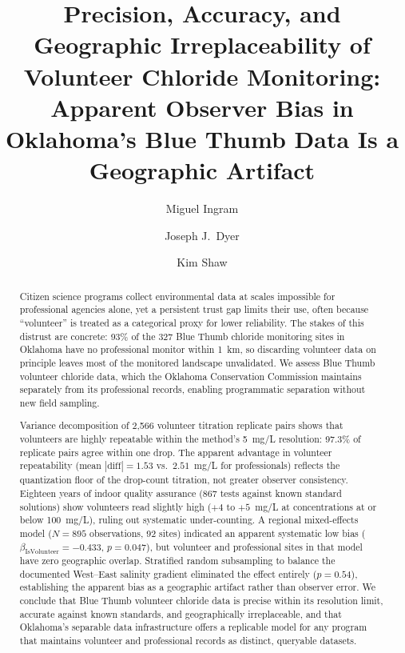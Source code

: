 \documentclass[lineno]{wlpeerj}
\begin{document}
\title{Precision, Accuracy, and Geographic Irreplaceability of Volunteer Chloride Monitoring: Apparent Observer Bias in Oklahoma's Blue Thumb Data Is a Geographic Artifact}

\author[1]{Miguel Ingram}
\author[2]{Joseph J.\ Dyer}
\author[2]{Kim Shaw}


\begin{abstract}
Citizen science programs collect environmental data at scales impossible for professional agencies alone, yet a persistent trust gap limits their use, often because ``volunteer'' is treated as a categorical proxy for lower reliability. The stakes of this distrust are concrete: 93\% of the 327 Blue Thumb chloride monitoring sites in Oklahoma have no professional monitor within 1~km, so discarding volunteer data on principle leaves most of the monitored landscape unvalidated. We assess Blue Thumb volunteer chloride data, which the Oklahoma Conservation Commission maintains separately from its professional records, enabling programmatic separation without new field sampling.

Variance decomposition of 2,566 volunteer titration replicate pairs shows that volunteers are highly repeatable within the method's 5~mg/L resolution: 97.3\% of replicate pairs agree within one drop. The apparent advantage in volunteer repeatability (mean $|\mathrm{diff}| = 1.53$ vs.\ $2.51$~mg/L for professionals) reflects the quantization floor of the drop-count titration, not greater observer consistency. Eighteen years of indoor quality assurance (867 tests against known standard solutions) show volunteers read slightly high ($+4$ to $+5$~mg/L at concentrations at or below 100~mg/L), ruling out systematic under-counting. A regional mixed-effects model ($N=895$ observations, 92 sites) indicated an apparent systematic low bias ($\beta_{\mathrm{IsVolunteer}} = -0.433$, $p = 0.047$), but volunteer and professional sites in that model have zero geographic overlap. Stratified random subsampling to balance the documented West--East salinity gradient \citep{Dyer2025} eliminated the effect entirely ($p = 0.54$), establishing the apparent bias as a geographic artifact rather than observer error. We conclude that Blue Thumb volunteer chloride data is precise within its resolution limit, accurate against known standards, and geographically irreplaceable, and that Oklahoma's separable data infrastructure offers a replicable model for any program that maintains volunteer and professional records as distinct, queryable datasets.
\end{abstract}
\end{document}
